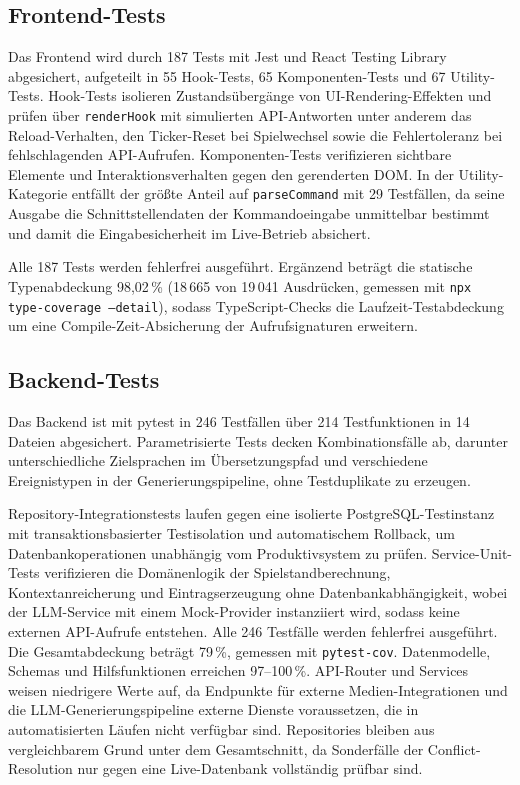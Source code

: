 \subsection{Frontend-Tests}\label{impl-frontend-tests}

Das Frontend wird durch 187 Tests mit Jest und React Testing Library abgesichert, aufgeteilt in 55 Hook-Tests, 65 Komponenten-Tests und 67 Utility-Tests. Hook-Tests isolieren Zustandsübergänge von UI-Rendering-Effekten und prüfen über \texttt{renderHook} mit simulierten API-Antworten unter anderem das Reload-Verhalten, den Ticker-Reset bei Spielwechsel sowie die Fehlertoleranz bei fehlschlagenden API-Aufrufen. Komponenten-Tests verifizieren sichtbare Elemente und Interaktionsverhalten gegen den gerenderten DOM. In der Utility-Kategorie entfällt der größte Anteil auf \texttt{parseCommand} mit 29 Testfällen, da seine Ausgabe die Schnittstellendaten der Kommandoeingabe unmittelbar bestimmt und damit die Eingabesicherheit im Live-Betrieb absichert.

Alle 187 Tests werden fehlerfrei ausgeführt. Ergänzend beträgt die statische Typenabdeckung 98{,}02\,\% (18\,665 von 19\,041 Ausdrücken, gemessen mit \texttt{npx type-coverage --detail}), sodass TypeScript-Checks die Laufzeit-Testabdeckung um eine Compile-Zeit-Absicherung der Aufrufsignaturen erweitern.


\subsection{Backend-Tests}\label{impl-backend-tests}

Das Backend ist mit pytest in 246 Testfällen über 214 Testfunktionen in 14 Dateien abgesichert. Parametrisierte Tests decken Kombinationsfälle ab, darunter unterschiedliche Zielsprachen im Übersetzungspfad und verschiedene Ereignistypen in der Generierungspipeline, ohne Testduplikate zu erzeugen.

Repository-Integrationstests laufen gegen eine isolierte PostgreSQL-Testinstanz mit transaktionsbasierter Testisolation und automatischem Rollback, um Datenbankoperationen unabhängig vom Produktivsystem zu prüfen. Service-Unit-Tests verifizieren die Domänenlogik der Spielstandberechnung, Kontextanreicherung und Eintragserzeugung ohne Datenbankabhängigkeit, wobei der LLM-Service mit einem Mock-Provider instanziiert wird, sodass keine externen API-Aufrufe entstehen. Alle 246 Testfälle werden fehlerfrei ausgeführt. Die Gesamtabdeckung beträgt 79\,\%, gemessen mit \texttt{pytest-cov}. Datenmodelle, Schemas und Hilfsfunktionen erreichen 97–100\,\%. API-Router und Services weisen niedrigere Werte auf, da Endpunkte für externe Medien-Integrationen und die LLM-Generierungspipeline externe Dienste voraussetzen, die in automatisierten Läufen nicht verfügbar sind. Repositories bleiben aus vergleichbarem Grund unter dem Gesamtschnitt, da Sonderfälle der Conflict-Resolution nur gegen eine Live-Datenbank vollständig prüfbar sind.

